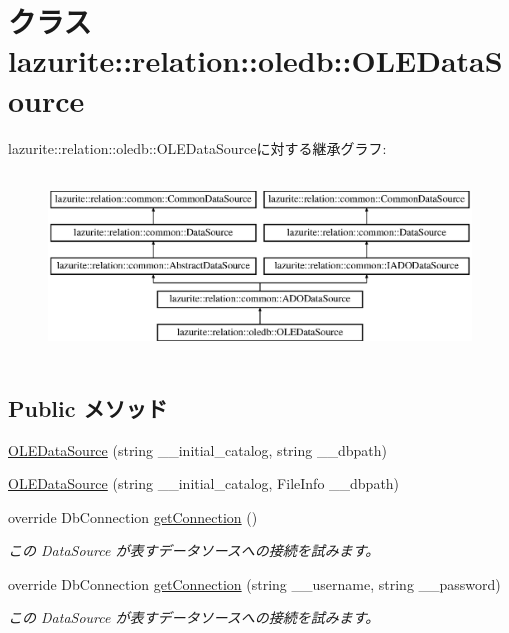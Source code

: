 \hypertarget{classlazurite_1_1relation_1_1oledb_1_1_o_l_e_data_source}{
\section{クラス lazurite::relation::oledb::OLEDataSource}
\label{classlazurite_1_1relation_1_1oledb_1_1_o_l_e_data_source}
}
lazurite::relation::oledb::OLEDataSourceに対する継承グラフ:\begin{figure}[H]
\begin{center}
\leavevmode
\includegraphics[height=4.96454cm]{classlazurite_1_1relation_1_1oledb_1_1_o_l_e_data_source}
\end{center}
\end{figure}
\subsection*{Public メソッド}
\begin{DoxyCompactItemize}
\item 
\hyperlink{classlazurite_1_1relation_1_1oledb_1_1_o_l_e_data_source_a8553c36006714e8f6a80cd8696edd390}{OLEDataSource} (string \_\-\_\-initial\_\-catalog, string \_\-\_\-dbpath)
\item 
\hyperlink{classlazurite_1_1relation_1_1oledb_1_1_o_l_e_data_source_a4685074d67dafaa0dbf017987be8b1a1}{OLEDataSource} (string \_\-\_\-initial\_\-catalog, FileInfo \_\-\_\-dbpath)
\item 
override DbConnection \hyperlink{classlazurite_1_1relation_1_1oledb_1_1_o_l_e_data_source_a7dbd44842590d2d1f11a6ddca7a393b7}{getConnection} ()
\begin{DoxyCompactList}\small\item\em この DataSource が表すデータソースへの接続を試みます。 \item\end{DoxyCompactList}\item 
override DbConnection \hyperlink{classlazurite_1_1relation_1_1oledb_1_1_o_l_e_data_source_a8bcb0954e47ca8ec4c117ade3e9f0ce9}{getConnection} (string \_\-\_\-username, string \_\-\_\-password)
\begin{DoxyCompactList}\small\item\em この DataSource が表すデータソースへの接続を試みます。 \item\end{DoxyCompactList}\end{DoxyCompactItemize}
